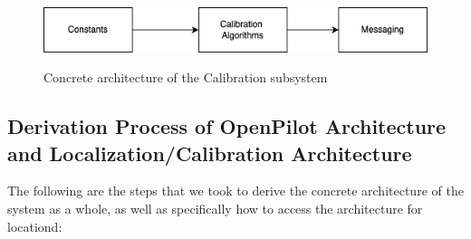 \documentclass[12pt]{article}
\begin{document}
\begin{figure}[H]
    \centering
    \includegraphics[scale=0.5]{concrete-architecture-calibration.png}\\
    \caption{Concrete architecture of the Calibration subsystem}
    \label{fig:enter-label}
\end{figure}

\subsection{Derivation Process of OpenPilot Architecture and Localization/Calibration Architecture}

The following are the steps that we took to derive the concrete architecture of the system as a whole, as well as specifically how to access the architecture for locationd:
\end{document}
